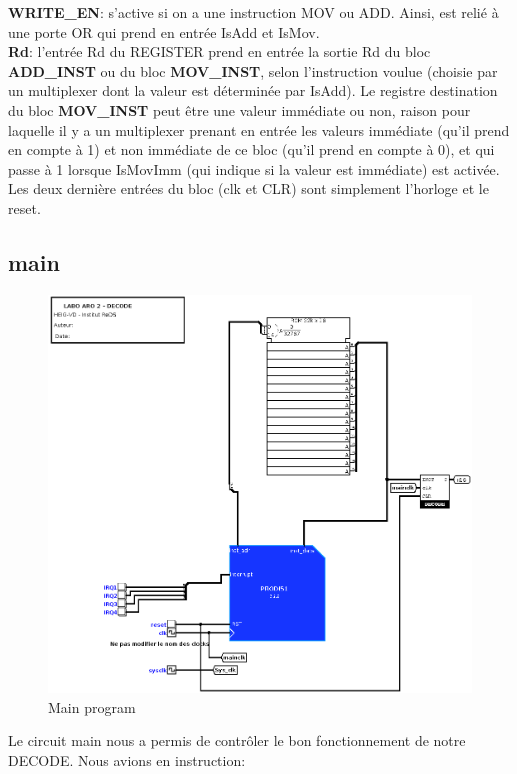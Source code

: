 \documentclass[a4paper]{article} %
\begin{document}
\textbf{WRITE\_EN}: s'active si on a une instruction MOV ou ADD. Ainsi, est relié à une porte OR qui prend en entrée IsAdd et IsMov.
\medskip \\
\textbf{Rd}: l'entrée Rd du REGISTER prend en entrée la sortie Rd du bloc \textbf{ADD\_INST} ou du bloc \textbf{MOV\_INST}, selon l'instruction voulue (choisie par un multiplexer dont la valeur est déterminée par IsAdd). Le registre destination du bloc \textbf{MOV\_INST} peut être une valeur immédiate ou non, raison pour laquelle il y a un multiplexer prenant en entrée les valeurs immédiate (qu'il prend en compte à 1) et non immédiate de ce bloc (qu'il prend en compte à 0), et qui passe à 1 lorsque IsMovImm (qui indique si la valeur est immédiate) est activée.
\medskip \\
Les deux dernière entrées du bloc (clk et CLR) sont simplement l'horloge et le reset.

\subsection{main}
\begin{figure}[H]
    \centering
    \includegraphics[width=1\textwidth]{src/main.png}
    \caption{Main program}
    \label{main_img}
\end{figure}

Le circuit main nous a permis de contrôler le bon fonctionnement de notre DECODE. Nous avions en instruction:
\end{document}
